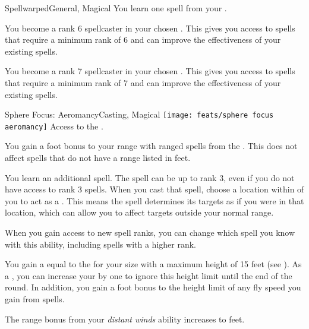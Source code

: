 \begin{magicalfeat}{Spellwarped}{General, Magical}
     You learn one spell from your .

     You become a rank 6 spellcaster in your chosen .
    This gives you access to spells that require a minimum rank of 6 and can improve the effectiveness of your existing spells.

     You become a rank 7 spellcaster in your chosen .
    This gives you access to spells that require a minimum rank of 7 and can improve the effectiveness of your existing spells.
  \end{magicalfeat}

  \begin{magicalfeat}{Sphere Focus: Aeromancy}{Casting, Magical}
    \texttt{[image: feats/sphere focus aeromancy]}
    \featpre Access to the  .

     You gain a  foot bonus to your range with ranged spells from the  .
    This does not affect spells that do not have a range listed in feet.

     You learn an additional spell.
    The spell can be up to rank 3, even if you do not have access to rank 3 spells.
    When you cast that spell, choose a location within \shortrange of you to act as a .
    This means the spell determines its targets as if you were in that location, which can allow you to affect targets outside your normal range.

    When you gain access to new spell ranks, you can change which spell you know with this ability, including spells with a higher rank.

     You gain a  equal to the  for your size with a maximum height of 15 feet (see ).
    As a , you can increase your  by one to ignore this height limit until the end of the round.
    In addition, you gain a  foot bonus to the height limit of any fly speed you gain from  spells.

     The range bonus from your \textit{distant winds} ability increases to  feet.
  \end{magicalfeat}

